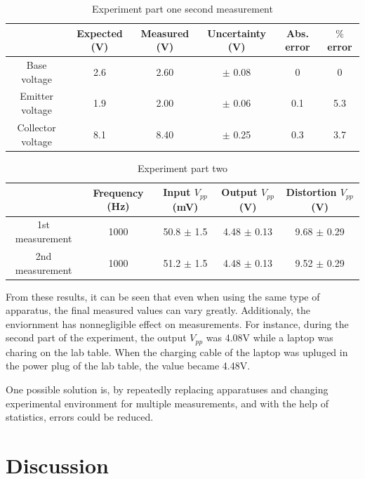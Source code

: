 \documentclass[11pt, a4paper]{article}
\begin{document}
\begin{table}[htbp]
\caption{Experiment part one second measurement}
\label{table:part_1_2nd}
\begin{center}
\begin{tabular}{|c|c|c|c|c|c|}
\hline
             & Expected (V) & Measured (V) & Uncertainty (V) & Abs. error & $\%$ error \\ \hline
Base voltage & 2.6 & 2.60 & $\pm$ 0.08 & 0 & 0 \\ \hline
Emitter voltage & 1.9 & 2.00 & $\pm$ 0.06 & 0.1 & 5.3 \\ \hline
Collector voltage & 8.1 & 8.40 & $\pm$ 0.25 & 0.3 & 3.7 \\ \hline
\end{tabular}
\end{center}  
\end{table}

\begin{table}[htbp]
\caption{Experiment part two}
\label{table:part_2}
\begin{center}
\begin{tabular}{ccccc}
\hline
  & Frequency (Hz) & Input $V_{pp}$ (mV) & Output $V_{pp}$ (V) & Distortion $V_{pp}$ (V) \\
\hline
1st measurement & 1000 & 50.8 $\pm$ 1.5 & 4.48 $\pm$ 0.13 & 9.68 $\pm$ 0.29 \\
2nd measurement & 1000 & 51.2 $\pm$ 1.5 & 4.48 $\pm$ 0.13 & 9.52 $\pm$ 0.29 \\ 
\hline
\end{tabular}
\end{center}
\end{table}

From these results, it can be seen that even when using the same type of apparatus, the final measured values can vary greatly. Additionaly, the enviornment has nonnegligible effect on measurements. For instance, during the second part of the experiment, the output $V_{pp}$ was 4.08V while a laptop was charing on the lab table. When the charging cable of the laptop was upluged in the power plug of the lab table, the value became 4.48V.

One possible solution is, by repeatedly replacing apparatuses and changing experimental environment for multiple measurements, and with the help of statistics, errors could be reduced.


\section{Discussion}
\end{document}
